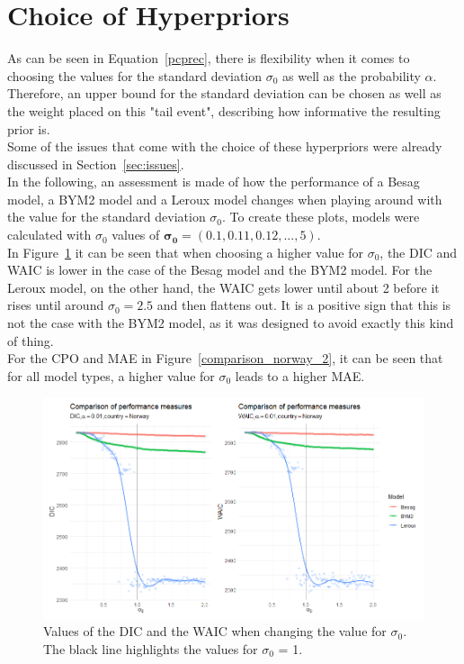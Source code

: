 \section{Choice of Hyperpriors}
As can be seen in Equation~\ref{pcprec}, there is flexibility when it comes to choosing the values for the standard deviation $\sigma_0$ as well as the probability $\alpha$. Therefore, an upper bound for the standard deviation can be chosen as well as the weight placed on this "tail event", describing how informative the resulting prior is. \\
Some of the issues that come with the choice of these hyperpriors were already discussed in Section~\ref{sec:issues}. \\
In the following, an assessment is made of how the performance of a Besag model, a BYM2 model and a Leroux model changes when playing around with the value for the standard deviation $\sigma_0$. To create these plots, models were calculated with $\sigma_0$ values of $\pmb{\sigma_0}=\left(0.1,0.11,0.12,...,5\right)$.\\
In Figure~\ref{comparison_norway_1} it can be seen that when choosing a higher value for $\sigma_0$, the DIC and WAIC is lower in the case of the Besag model and the BYM2 model. For the Leroux model, on the other hand, the WAIC gets lower until about 2 before it rises until around $\sigma_0 = 2.5$ and then flattens out. It is a positive sign that this is not the case with the BYM2 model, as it was designed to avoid exactly this kind of thing. \\
For the CPO and MAE in Figure~\ref{comparison_norway_2}, it can be seen that for all model types, a higher value for $\sigma_0$ leads to a higher MAE.
\begin{figure}[H]
  \centering
  \includegraphics[width = \textwidth]{comparison_1_norway.png}
  \caption{Values of the DIC and the WAIC when changing the value for $\sigma_0$. The black line highlights the values for $\sigma_0$ = 1.}
  \label{comparison_norway_1}
\end{figure}
